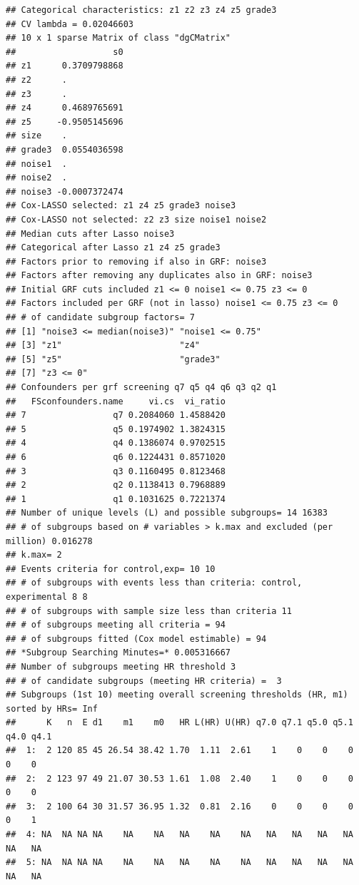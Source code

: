 \documentclass[smallextended]{svjour3}
\makeatletter
\newenvironment{kframe}{%
 \def\at@end@of@kframe{}%
 \ifinner\ifhmode%
  \def\at@end@of@kframe{\end{minipage}}%
  \begin{minipage}{\columnwidth}%
 \fi\fi%
 \def\FrameCommand##1{\hskip\@totalleftmargin \hskip-\fboxsep
 \colorbox{shadecolor}{##1}\hskip-\fboxsep
     \hskip-\linewidth \hskip-\@totalleftmargin \hskip\columnwidth}%
 \MakeFramed {\advance\hsize-\width
   \@totalleftmargin\z@ \linewidth\hsize
   \@setminipage}}%
 {\par\unskip\endMakeFramed%
 \at@end@of@kframe}
\newenvironment{knitrout}{}{} %
\makeatother
\begin{document}
\begin{knitrout}
\begin{kframe}
\begin{verbatim}
## Categorical characteristics: z1 z2 z3 z4 z5 grade3 
## CV lambda = 0.02046603 
## 10 x 1 sparse Matrix of class "dgCMatrix"
##                   s0
## z1      0.3709798868
## z2      .           
## z3      .           
## z4      0.4689765691
## z5     -0.9505145696
## size    .           
## grade3  0.0554036598
## noise1  .           
## noise2  .           
## noise3 -0.0007372474
## Cox-LASSO selected: z1 z4 z5 grade3 noise3 
## Cox-LASSO not selected: z2 z3 size noise1 noise2 
## Median cuts after Lasso noise3 
## Categorical after Lasso z1 z4 z5 grade3 
## Factors prior to removing if also in GRF: noise3 
## Factors after removing any duplicates also in GRF: noise3 
## Initial GRF cuts included z1 <= 0 noise1 <= 0.75 z3 <= 0 
## Factors included per GRF (not in lasso) noise1 <= 0.75 z3 <= 0 
## # of candidate subgroup factors= 7 
## [1] "noise3 <= median(noise3)" "noise1 <= 0.75"          
## [3] "z1"                       "z4"                      
## [5] "z5"                       "grade3"                  
## [7] "z3 <= 0"                 
## Confounders per grf screening q7 q5 q4 q6 q3 q2 q1 
##   FSconfounders.name     vi.cs  vi_ratio
## 7                 q7 0.2084060 1.4588420
## 5                 q5 0.1974902 1.3824315
## 4                 q4 0.1386074 0.9702515
## 6                 q6 0.1224431 0.8571020
## 3                 q3 0.1160495 0.8123468
## 2                 q2 0.1138413 0.7968889
## 1                 q1 0.1031625 0.7221374
## Number of unique levels (L) and possible subgroups= 14 16383 
## # of subgroups based on # variables > k.max and excluded (per million) 0.016278 
## k.max= 2 
## Events criteria for control,exp= 10 10 
## # of subgroups with events less than criteria: control, experimental 8 8 
## # of subgroups with sample size less than criteria 11 
## # of subgroups meeting all criteria = 94 
## # of subgroups fitted (Cox model estimable) = 94 
## *Subgroup Searching Minutes=* 0.005316667 
## Number of subgroups meeting HR threshold 3 
## # of candidate subgroups (meeting HR criteria) =  3 
## Subgroups (1st 10) meeting overall screening thresholds (HR, m1) sorted by HRs= Inf 
##      K   n  E d1    m1    m0   HR L(HR) U(HR) q7.0 q7.1 q5.0 q5.1 q4.0 q4.1
##  1:  2 120 85 45 26.54 38.42 1.70  1.11  2.61    1    0    0    0    0    0
##  2:  2 123 97 49 21.07 30.53 1.61  1.08  2.40    1    0    0    0    0    0
##  3:  2 100 64 30 31.57 36.95 1.32  0.81  2.16    0    0    0    0    0    1
##  4: NA  NA NA NA    NA    NA   NA    NA    NA   NA   NA   NA   NA   NA   NA
##  5: NA  NA NA NA    NA    NA   NA    NA    NA   NA   NA   NA   NA   NA   NA

\end{verbatim}
\end{kframe}
\end{knitrout}
\end{document}
